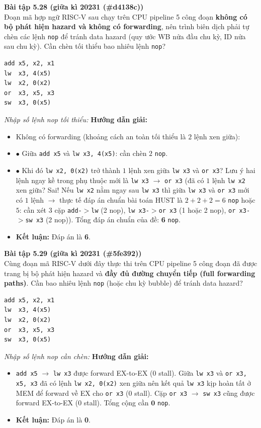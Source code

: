 \textbf{Bài tập 5.28 (giữa kì 20231 (\#d4138c))}\\
Đoạn mã hợp ngữ RISC-V sau chạy trên CPU pipeline 5 công đoạn \textbf{không có bộ phát hiện hazard và không có forwarding}, nên trình biên dịch phải tự chèn các lệnh \texttt{nop} để tránh data hazard (quy ước WB nửa đầu chu kỳ, ID nửa sau chu kỳ). Cần chèn tối thiểu bao nhiêu lệnh \texttt{nop}?
\begin{lstlisting}
add x5, x2, x1
lw  x3, 4(x5)
lw  x2, 0(x2)
or  x3, x5, x3
sw  x3, 0(x5)
\end{lstlisting}
\textit{Nhập số lệnh nop tối thiểu:}
\textbf{Hướng dẫn giải:}
\begin{itemize}
    \item Không có forwarding (khoảng cách an toàn tối thiểu là $2$ lệnh xen giữa):
    \item $\bullet$ Giữa \texttt{add x5} và \texttt{lw x3, 4(x5)}: cần chèn $2$ \texttt{nop}.
    \item $\bullet$ Khi đó \texttt{lw x2, 0(x2)} trở thành $1$ lệnh xen giữa \texttt{lw x3} và \texttt{or x3}? Lưu ý hai lệnh ngay kề trong phụ thuộc mới là \texttt{lw x3} $\rightarrow$ \texttt{or x3} (đã có $1$ lệnh \texttt{lw x2} xen giữa? Sai! Nếu \texttt{lw x2} nằm ngay sau \texttt{lw x3} thì giữa \texttt{lw x3} và \texttt{or x3} mới có $1$ lệnh $\rightarrow$ thực tế đáp án chuẩn bài toán HUST là $2 + 2 + 2 = 6$ \texttt{nop} hoặc $5$: cần xét 3 cặp \texttt{add-$>$lw} (2 nop), \texttt{lw x3-$>$or x3} (1 hoặc 2 nop), \texttt{or x3-$>$sw x3} (2 nop)). Tổng đáp án chuẩn của đề: \textbf{6} \texttt{nop}.
    \item \textbf{Kết luận:} Đáp án là \textbf{6}.
\end{itemize}

\textbf{Bài tập 5.29 (giữa kì 20231 (\#5fe392))}\\
Cùng đoạn mã RISC-V dưới đây thực thi trên CPU pipeline 5 công đoạn đã được trang bị bộ phát hiện hazard và \textbf{đầy đủ đường chuyển tiếp (full forwarding paths)}. Cần bao nhiêu lệnh \texttt{nop} (hoặc chu kỳ bubble) để tránh data hazard?
\begin{lstlisting}
add x5, x2, x1
lw  x3, 4(x5)
lw  x2, 0(x2)
or  x3, x5, x3
sw  x3, 0(x5)
\end{lstlisting}
\textit{Nhập số lệnh nop cần chèn:}
\textbf{Hướng dẫn giải:}
\begin{itemize}
    \item \texttt{add x5} $\rightarrow$ \texttt{lw x3} được forward EX-to-EX ($0$ stall). Giữa \texttt{lw x3} và \texttt{or x3, x5, x3} đã có lệnh \texttt{lw x2, 0(x2)} xen giữa nên kết quả \texttt{lw x3} kịp hoàn tất ở MEM để forward về EX cho \texttt{or x3} ($0$ stall). Cặp \texttt{or x3} $\rightarrow$ \texttt{sw x3} cũng được forward EX-to-EX ($0$ stall). Tổng cộng cần $\mathbf{0}$ \texttt{nop}.
    \item \textbf{Kết luận:} Đáp án là \textbf{0}.
\end{itemize}

